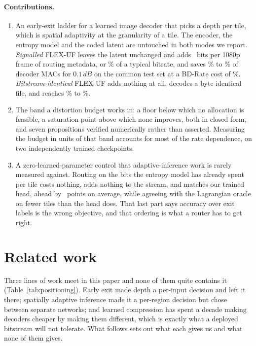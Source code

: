 \documentclass[10pt,twocolumn,letterpaper]{article}
\newcommand{\dB}{\,dB}
\begin{document}
\paragraph{Contributions.}
\begin{enumerate}\itemsep2pt
\item An early-exit ladder for a learned image decoder that picks a depth per
      tile, which is spatial adaptivity at the granularity of a tile. The
      encoder, the entropy model and the coded latent are untouched in both
      modes we report. \emph{Signalled} FLEX-UF leaves the latent unchanged and
      adds \MapBits\ bits per 1080p frame of routing metadata, or
      \MapOverheadLow\% of a typical bitrate, and saves \MainLowRate\% to
      \MainHighRate\% of decoder MACs for $0.1\dB$ on the common test set at a
      BD-Rate cost of \BdRateALow\%. \emph{Bitstream-identical} FLEX-UF adds
      nothing at all, decodes a byte-identical file, and reaches
      \RouterLowRate\% to \RouterHighRate\%.
\item The band a distortion budget works in: a floor below which no
      allocation is feasible, a saturation point above which none improves, both
      in closed form, and seven propositions verified numerically rather than
      asserted. Measuring the budget in units of that band accounts for most
      of the rate dependence, on two independently trained checkpoints.
\item A zero-learned-parameter control that adaptive-inference work is rarely measured
      against. Routing on the bits the entropy model has already spent per tile
      costs nothing, adds nothing to the stream, and matches our trained head,
      ahead by \RateRankBeatsMean\ points on average, while agreeing with the
      Lagrangian oracle on fewer tiles than the head does. That last part says
      accuracy over exit labels is the wrong objective, and that ordering is
      what a router has to get right.
\end{enumerate}

\section{Related work}

Three lines of work meet in this paper and none of them quite contains it (Table~\ref{tab:positioning}). Early
exit made depth a per-input decision and left it there; spatially adaptive
inference made it a per-region decision but chose between separate networks; and
learned compression has spent a decade making decoders cheaper by making them
different, which is exactly what a deployed bitstream will not tolerate. What
follows sets out what each gives us and what none of them gives.
\end{document}

